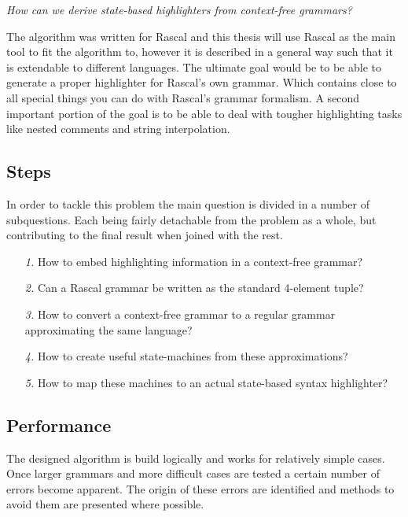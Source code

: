\begin{center}\emph{\large How can we derive state-based highlighters from context-free grammars?}\end{center}
The algorithm was written for Rascal and this thesis will use Rascal as the main tool to fit the algorithm to, however it is described in a general way such that it is extendable to different languages. The ultimate goal would be to be able to generate a proper highlighter for Rascal's own grammar. Which contains close to all special things you can do with Rascal's grammar formalism. A second important portion of the goal is to be able to deal with tougher highlighting tasks like nested comments and string interpolation.

\subsection{Steps} \label{sec:problemdef:sub}
In order to tackle this problem the main question is divided in a number of subquestions. Each being fairly detachable from the problem as a whole, but contributing to the final result when joined with the rest.

\begin{enumerate}
	\item[\textit{1.}] How to embed highlighting information in a context-free grammar?
	\item[\textit{2.}] Can a Rascal grammar be written as the standard 4-element tuple?
	\item[\textit{3.}] How to convert a context-free grammar to a regular grammar approximating the same language?
	\item[\textit{4.}] How to create useful state-machines from these approximations?
	\item[\textit{5.}] How to map these machines to an actual state-based syntax highlighter?
\end{enumerate}

\subsection{Performance}
The designed algorithm is build logically and works for relatively simple cases. Once larger grammars and more difficult cases are tested a certain number of errors become apparent. The origin of these errors are identified and methods to avoid them are presented where possible.

